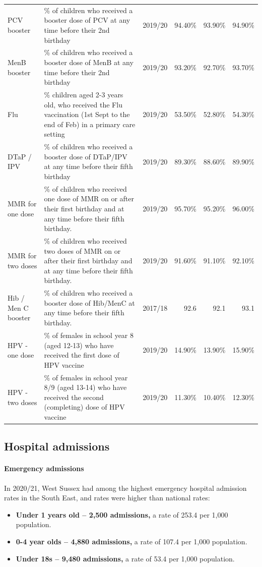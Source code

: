 \begin{table}[hbt]
\begin{tabular}{llrrrr}
    PCV booster & \% of children who received a booster dose of PCV at any time before their 2nd birthday & 2019/20 & 94.40\% & 93.90\% & 94.90\% \\
    MenB booster & \% of children who received a booster dose of MenB at any time before their 2nd birthday & 2019/20 & 93.20\% & 92.70\% & 93.70\% \\
    Flu & \% children aged 2-3 years old, who received the Flu vaccination (1st Sept to the end of Feb) in a primary care setting & 2019/20 & 53.50\% & 52.80\% & 54.30\% \\
    DTaP / IPV & \% of children who received a booster dose of DTaP/IPV at any time before their fifth birthday & 2019/20 & 89.30\% & 88.60\% & 89.90\% \\
    MMR for one dose & \% of children who received one dose of MMR on or after their first birthday and at any time before their fifth birthday. & 2019/20 & 95.70\% & 95.20\% & 96.00\% \\
    MMR for two doses & \% of children who received two doses of MMR on or after their first birthday and at any time before their fifth birthday. &  2019/20 & 91.60\% & 91.10\% & 92.10\% \\
    Hib / Men C booster & \% of children who received a booster dose of Hib/MenC at any time before their fifth birthday. & 2017/18 & 92.6 & 92.1 & 93.1 \\
    HPV - one dose & \% of females in school year 8 (aged 12-13) who have received the first dose of HPV vaccine & 2019/20 & 14.90\% & 13.90\% & 15.90\% \\
    HPV - two doses & \% of females in school year 8/9 (aged 13-14) who have received the second (completing) dose of HPV vaccine & 2019/20 & 11.30\% &10.40\% & 12.30\% \\
    \bottomrule
\end{tabular}
\label{tab:childhoodimms}
\end{table}
\normalsize
\subsection{Hospital admissions}
\paragraph{Emergency admissions}In 2020/21, West Sussex had among the highest emergency hospital admission rates in the South East, and rates were higher than national rates:
\begin{itemize}[noitemsep]
    \item {\bfseries Under 1 years old -- 2,500 admissions,} a rate of 253.4 per 1,000 population.
    \item {\bfseries 0-4 year olds -- 4,880 admissions,} a rate of 107.4 per 1,000 population.
    \item {\bfseries Under 18s -- 9,480 admissions,} a rate of 53.4 per 1,000 population.
\end{itemize}
